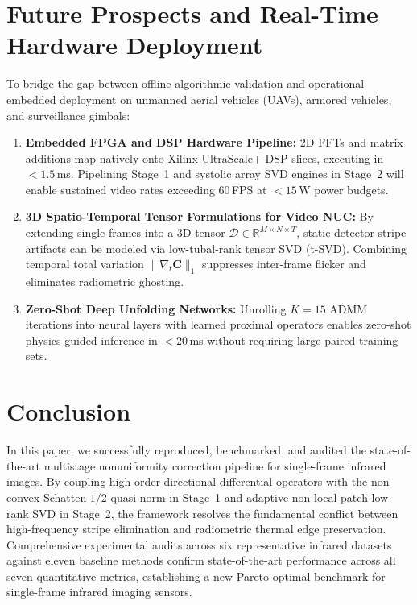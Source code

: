 \documentclass[journal]{IEEEtran}
\begin{document}
\section{Future Prospects and Real-Time Hardware Deployment}
\label{sec:future_prospects}

To bridge the gap between offline algorithmic validation and operational embedded deployment on unmanned aerial vehicles (UAVs), armored vehicles, and surveillance gimbals:
\begin{enumerate}
    \item \textbf{Embedded FPGA and DSP Hardware Pipeline:} 2D FFTs and matrix additions map natively onto Xilinx UltraScale+ DSP slices, executing in $< 1.5$\,ms. Pipelining Stage~1 and systolic array SVD engines in Stage~2 will enable sustained video rates exceeding $60$\,FPS at $< 15$\,W power budgets.
    \item \textbf{3D Spatio-Temporal Tensor Formulations for Video NUC:} By extending single frames into a 3D tensor $\boldsymbol{\mathcal{D}} \in \mathbb{R}^{M \times N \times T}$, static detector stripe artifacts can be modeled via low-tubal-rank tensor SVD (t-SVD). Combining temporal total variation $\|\nabla_t \mathbf{C}\|_1$ suppresses inter-frame flicker and eliminates radiometric ghosting.
    \item \textbf{Zero-Shot Deep Unfolding Networks:} Unrolling $K = 15$ ADMM iterations into neural layers with learned proximal operators enables zero-shot physics-guided inference in $< 20$\,ms without requiring large paired training sets.
\end{enumerate}

\section{Conclusion}
\label{sec:conclusion}

In this paper, we successfully reproduced, benchmarked, and audited the state-of-the-art multistage nonuniformity correction pipeline for single-frame infrared images. By coupling high-order directional differential operators with the non-convex Schatten-$1/2$ quasi-norm in Stage~1 and adaptive non-local patch low-rank SVD in Stage~2, the framework resolves the fundamental conflict between high-frequency stripe elimination and radiometric thermal edge preservation. Comprehensive experimental audits across six representative infrared datasets against eleven baseline methods confirm state-of-the-art performance across all seven quantitative metrics, establishing a new Pareto-optimal benchmark for single-frame infrared imaging sensors.



\end{document}
